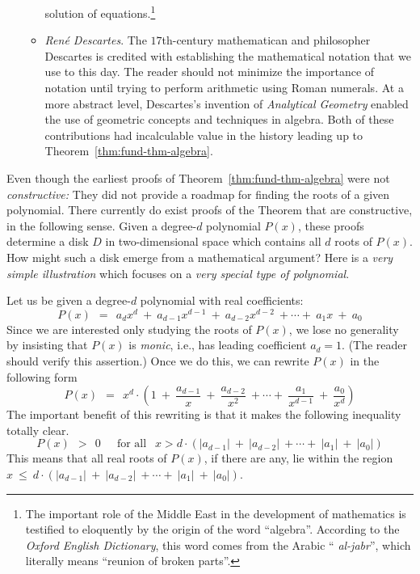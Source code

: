 \begin{itemize}
\begin{itemize}
solution of equations.\footnote{The important role of the Middle East
  in the development of mathematics is testified to eloquently by the
  origin of the word ``algebra''.  According to the {\it Oxford
    English Dictionary}, this word comes from the Arabic ``{\it
    al-jabr}'', which literally means ``reunion of broken
  parts''. }
   \item
{\it Ren\'{e} Descartes}. 
The $17$th-century mathematican and philosopher Descartes is credited
with establishing the mathematical notation that we use to this day.
The reader should not minimize the importance of notation until trying
to perform arithmetic using Roman numerals.  At a more abstract level,
Descartes's invention of {\em Analytical Geometry}
enabled the use of geometric concepts and techniques in algebra.  Both
of these contributions had incalculable value in the history leading
up to Theorem~\ref{thm:fund-thm-algebra}.
   \end{itemize}
\end{itemize}

\medskip

Even though the earliest proofs of Theorem~\ref{thm:fund-thm-algebra}
were not {\em constructive:} They did not provide a roadmap for
finding the roots of a given polynomial.  There currently do exist
proofs of the Theorem that are constructive, in the following sense.
Given a degree-$d$ polynomial $P(x)$, these proofs determine a disk
$D$ in two-dimensional space which contains all $d$ roots of $P(x)$.
How might such a disk emerge from a mathematical argument?  Here is a
{\em very simple illustration} which focuses on a {\em very special
  type of polynomial}.

Let us be given a degree-$d$ polynomial with real coefficients:
\[ P(x) \ \ = \ \ a_d x^d \ + \ a_{d-1} x^{d-1} \ + \ a_{d-2} x^{d-2}
\ + \cdots + \ a_1 x \ + \ a_0
\]
Since we are interested only studying the roots of $P(x)$, we lose no
generality by insisting that $P(x)$ is {\em monic},
 i.e., has leading coefficient $a_d = 1$.
(The reader should verify this assertion.)  Once we do this, we can
rewrite $P(x)$ in the following form
\[ P(x) \ \ = \ \ 
x^d \cdot \left( 1 \ + \ \frac{a_{d-1}}{x} \ + \ \frac{a_{d-2}}{x^2}
\ + \cdots + \ \frac{a_1}{x^{d-1}} \ + \ \frac{a_0}{x^d} \right)
\]
The important benefit of this rewriting is that it makes the following
inequality totally clear.
\[ P(x) \ \ > \ \ 0 \ \ \ \ \ \mbox{ for all } \ \ x >
d \cdot \left(|a_{d-1}| \ + \ |a_{d-2}|
\ + \cdots + \ |a_1| \ + \ |a_0| \right)
\]
This means that all real roots of $P(x)$, if there are any, lie within
the region $x \ \leq \ d \cdot \left(|a_{d-1}| \ + \ |a_{d-2}|
\ + \cdots + \ |a_1| \ + \ |a_0| \right)$.

